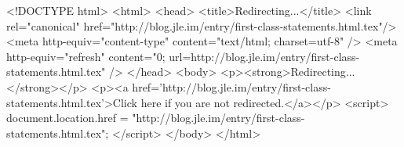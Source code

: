 <!DOCTYPE html>
<html>
<head>
<title>Redirecting...</title>
<link rel="canonical" href="http://blog.jle.im/entry/first-class-statements.html.tex"/>
<meta http-equiv="content-type" content="text/html; charset=utf-8" />
<meta http-equiv="refresh" content="0; url=http://blog.jle.im/entry/first-class-statements.html.tex" />
</head>
<body>
  <p><strong>Redirecting...</strong></p>
  <p><a href='http://blog.jle.im/entry/first-class-statements.html.tex'>Click here if you are not redirected.</a></p>
  <script>
    document.location.href = "http://blog.jle.im/entry/first-class-statements.html.tex";
  </script>
</body>
</html>
